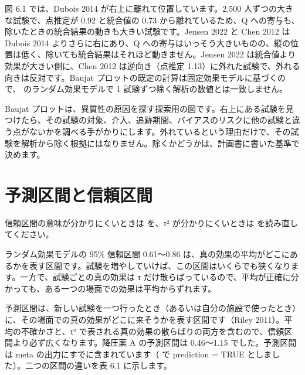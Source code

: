 図 6.1 では、Dubois 2014 が右上に離れて位置しています。2,500 人ずつの大きな試験で、点推定が 0.92 と統合値の 0.73 から離れているため、Q への寄与も、除いたときの統合結果の動きも大きい試験です。Jensen 2022 と Chen 2012 は Dubois 2014 よりさらに右にあり、Q への寄与はいっそう大きいものの、縦の位置は低く、除いても統合結果はそれほど動きません。Jensen 2022 は統合値より効果が大きい側に、Chen 2012 は逆向き（点推定 1.13）に外れた試験で、外れる向きは反対です。Baujat プロットの既定の計算は固定効果モデルに基づくので、 のランダム効果モデルで 1 試験ずつ除く解析の数値とは一致しません。

Baujat プロットは、異質性の原因を探す探索用の図です。右上にある試験を見つけたら、その試験の対象、介入、追跡期間、バイアスのリスクに他の試験と違う点がないかを調べる手がかりにします。外れているという理由だけで、その試験を解析から除く根拠にはなりません。除くかどうかは、計画書に書いた基準で決めます。

\section{予測区間と信頼区間}
\label{sec:06-3}

信頼区間の意味が分かりにくいときは  を、τ² が分かりにくいときは  を読み直してください。

ランダム効果モデルの 95\% 信頼区間 0.61〜0.86 は、真の効果の平均がどこにあるかを表す区間です。試験を増やしていけば、この区間はいくらでも狭くなります。一方で、試験ごとの真の効果は τ だけ散らばっているので、平均が正確に分かっても、ある一つの場面での効果は平均からずれます。

予測区間は、新しい試験を一つ行ったとき（あるいは自分の施設で使ったとき）に、その場面での真の効果がどこに来そうかを表す区間です（Riley 2011）。平均の不確かさと、τ² で表される真の効果の散らばりの両方を含むので、信頼区間より必ず広くなります。降圧薬 A の予測区間は 0.46〜1.15 でした。予測区間は meta の出力にすでに含まれています（ で prediction = TRUE としました）。二つの区間の違いを表 6.1 に示します。

\begin{kkcenter}
\end{kkcenter}

